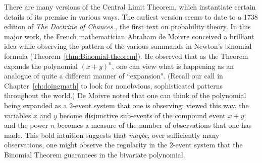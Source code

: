 \bigskip

\noindent {}

\bigskip

There are many versions of the Central Limit Theorem, which instantiate certain details of its premise in various ways.  The earliest version seems to date to a 1738 edition of {\it The Doctrine of Chances} \cite{DeMoivre}, the first text on probability theory.  In this major work, the French mathematician Abraham de Moivre conceived a brilliant idea while observing the pattern of the various summands in Newton's binomial formula (Theorem~\ref{thm:Binomial-theorem}).  He observed that as the Theorem expands the polynomial $(x+y)^n$, one can view what is happening as an analogue of quite a different manner of ``expansion".  (Recall our call in Chapter~\ref{ch:doingmath} to look for nonobvious, sophisticated patterns throughout the world.)  De Moivre noted that one can think of the polynomial being expanded as a $2$-event system that one is observing: viewed this way, the variables $x$ and $y$ become disjunctive sub-events of the compound event $x+y$; and the power $n$ becomes a measure of the number of observations that one has made.  This bold intuition suggests that {\em maybe}, over sufficiently many observations, one might observe the regularity in the $2$-event system that the Binomial Theorem guarantees in the bivariate polynomial.

